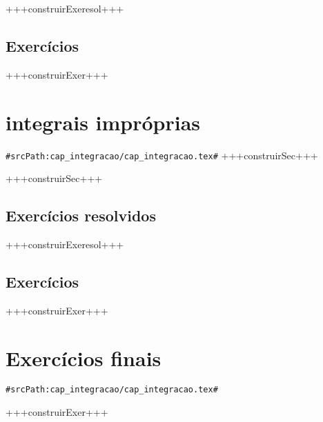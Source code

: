 +++construirExeresol+++


\subsection*{Exercícios}

+++construirExer+++


\section{integrais impróprias}
\verb+#srcPath:cap_integracao/cap_integracao.tex#+
+++construirSec+++


+++construirSec+++

\subsection*{Exercícios resolvidos}

+++construirExeresol+++


\subsection*{Exercícios}

+++construirExer+++


\section{Exercícios finais}
\verb+#srcPath:cap_integracao/cap_integracao.tex#+


+++construirExer+++
